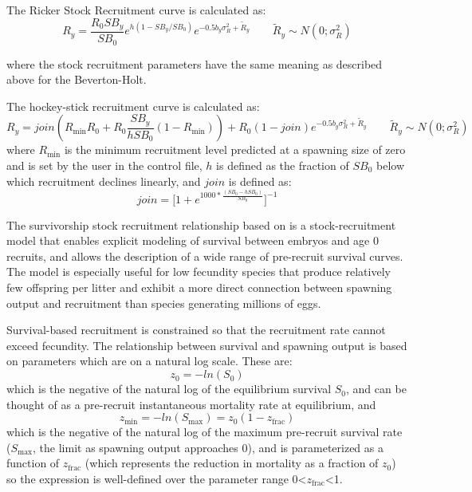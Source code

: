 \hypertarget{Ricker}{}
The Ricker Stock Recruitment curve is calculated as:
\begin{equation}{R_y = \frac{R_0SB_y}{SB_0}e^{h(1-SB_y/SB_0)}e^{-0.5b_y\sigma^2_R+\tilde{R}_y}\qquad  \tilde{R}_y\sim N(0;\sigma^2_R)}
\end{equation}

where the stock recruitment parameters have the same meaning as described above for the Beverton-Holt.

\hypertarget{Hockey}{}
The hockey-stick recruitment curve is calculated as:
\begin{equation}{R_y = join(R_{\text{min}}R_0+R_0\frac{SB_y}{hSB_0}(1-R_{\text{min}}))+R_0(1-join)e^{-0.5b_y\sigma^2_R+\tilde{R}_y}\qquad  \tilde{R}_y\sim N(0;\sigma^2_R)}\end{equation}
where $R_{\text{min}}$ is the minimum recruitment level predicted at a spawning size of zero and is set by the user in the control file, $h$ is defined as the fraction of $SB_0$ below which recruitment declines linearly, and $join$ is defined as:
\begin{equation}{ join = \bigg[1+e^{1000*\frac{(SB_0-hSB_0)}{SB_0}}\bigg]^{-1} } \end{equation}

\hypertarget{Survivorship}{}
The survivorship stock recruitment relationship based on \citet{taylor-stockrecruitment-2013} is a stock-recruitment model that enables explicit modeling of survival between embryos and age 0 recruits, and allows the description of a wide range of pre-recruit survival curves. The model is especially useful for low fecundity species that produce relatively few offspring per litter and exhibit a more direct connection between spawning output and recruitment than species generating millions of eggs.

Survival-based recruitment is constrained so that the recruitment rate cannot exceed fecundity. The relationship between survival and spawning output is based on parameters which are on a natural log scale. These are:
\begin{equation}
z_0=-ln(S_0)
\end{equation} 
which is the negative of the natural log of the equilibrium survival $S_0$, and can be thought of as a pre-recruit instantaneous mortality rate at equilibrium, and
\begin{equation}
z_{\text{min}}=-ln(S_{\text{max}})=z_0(1-z_{\text{frac}})
\end{equation}
which is the negative of the natural log of the maximum pre-recruit survival rate ($S_{\text{max}}$, the limit as spawning output approaches 0), and is parameterized as a function of $z_{\text{frac}}$ (which represents the reduction in mortality as a fraction of $z_0$) so the expression is well-defined over the parameter range 0<$z_{\text{frac}}$<1.

